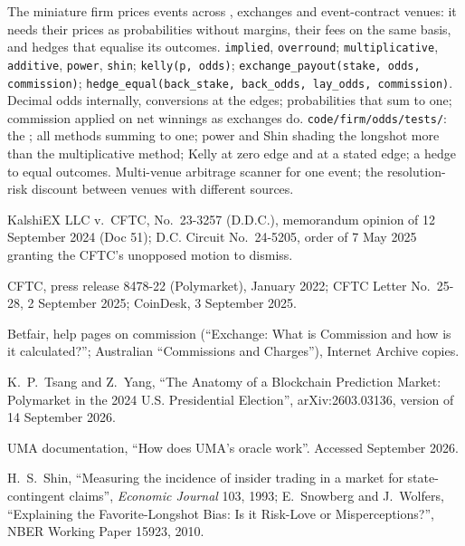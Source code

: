 \begin{build}
 The miniature firm prices events across , exchanges and event-contract venues: it needs their prices as probabilities without
margins, their fees on the same basis, and hedges that equalise its outcomes.
 \texttt{implied}, \texttt{overround}; \texttt{multiplicative}, \texttt{additive}, \texttt{power}, \texttt{shin}; \texttt{kelly(p, odds)};
\texttt{exchange\_payout(stake, odds, commission)}; \texttt{hedge\_equal(back\_stake, back\_odds, lay\_odds, commission)}.
 Decimal odds internally, conversions at the edges; probabilities that sum to one; commission applied on net winnings as exchanges do.
 \texttt{code/firm/odds/tests/}: the ; all methods summing to one; power and Shin shading the longshot more than the
multiplicative method; Kelly at zero edge and at a stated edge; a hedge to equal outcomes.
 Multi-venue arbitrage scanner for one event; the resolution-risk discount between venues with different sources.
\end{build}

\begin{omsources}
\item KalshiEX LLC v.\ CFTC, No.\ 23-3257 (D.D.C.), memorandum opinion of 12 September 2024 (Doc 51); D.C. Circuit No.\ 24-5205, order of 7 May 2025
granting the CFTC's unopposed motion to dismiss.
\item CFTC, press release 8478-22 (Polymarket), January 2022; CFTC Letter No.\ 25-28, 2 September 2025; CoinDesk, 3 September 2025.
\item Betfair, help pages on commission (``Exchange: What is Commission and how is it calculated?''; Australian ``Commissions and Charges''),
Internet Archive copies.
\item K.~P.~Tsang and Z.~Yang, ``The Anatomy of a Blockchain Prediction Market: Polymarket in the 2024 U.S. Presidential Election'',
arXiv:2603.03136, version of 14 September 2026.
\item UMA documentation, ``How does UMA's oracle work''. Accessed September 2026.
\item H.~S.~Shin, ``Measuring the incidence of insider trading in a market for state-contingent claims'', \emph{Economic Journal} 103, 1993; E.~Snowberg
and J.~Wolfers, ``Explaining the Favorite-Longshot Bias: Is it Risk-Love or Misperceptions?'', NBER Working Paper 15923, 2010.
\end{omsources}


